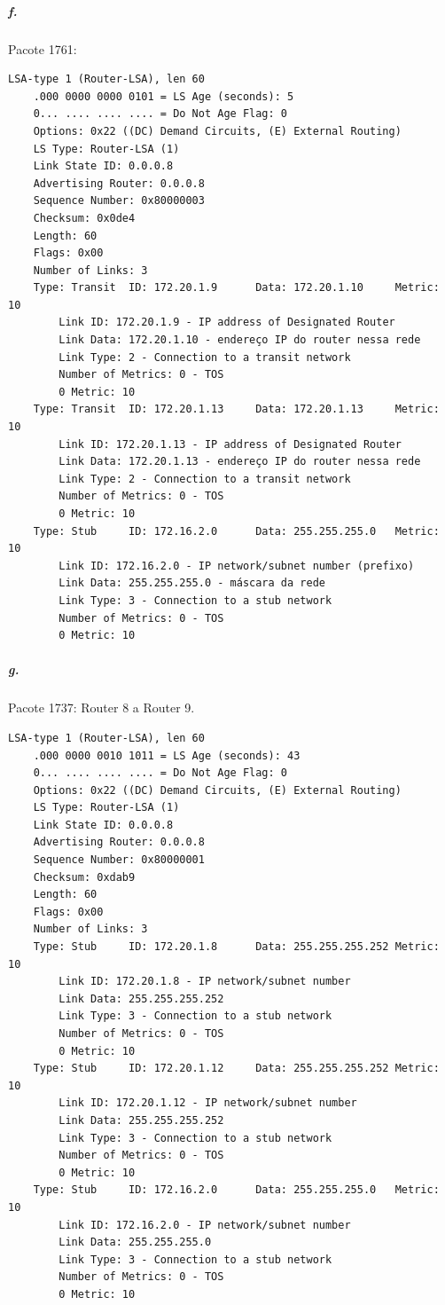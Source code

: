 \subparagraph{f.}
Pacote 1761:
\begin{verbatim}
LSA-type 1 (Router-LSA), len 60
    .000 0000 0000 0101 = LS Age (seconds): 5
    0... .... .... .... = Do Not Age Flag: 0
    Options: 0x22 ((DC) Demand Circuits, (E) External Routing)
    LS Type: Router-LSA (1)
    Link State ID: 0.0.0.8
    Advertising Router: 0.0.0.8
    Sequence Number: 0x80000003
    Checksum: 0x0de4
    Length: 60
    Flags: 0x00
    Number of Links: 3
    Type: Transit  ID: 172.20.1.9      Data: 172.20.1.10     Metric: 10
        Link ID: 172.20.1.9 - IP address of Designated Router
        Link Data: 172.20.1.10 - endereço IP do router nessa rede
        Link Type: 2 - Connection to a transit network
        Number of Metrics: 0 - TOS
        0 Metric: 10
    Type: Transit  ID: 172.20.1.13     Data: 172.20.1.13     Metric: 10
        Link ID: 172.20.1.13 - IP address of Designated Router
        Link Data: 172.20.1.13 - endereço IP do router nessa rede
        Link Type: 2 - Connection to a transit network
        Number of Metrics: 0 - TOS
        0 Metric: 10
    Type: Stub     ID: 172.16.2.0      Data: 255.255.255.0   Metric: 10
        Link ID: 172.16.2.0 - IP network/subnet number (prefixo)
        Link Data: 255.255.255.0 - máscara da rede
        Link Type: 3 - Connection to a stub network
        Number of Metrics: 0 - TOS
        0 Metric: 10
\end{verbatim}

\subparagraph{g.}
Pacote 1737: Router 8 a Router 9.
\begin{verbatim}
LSA-type 1 (Router-LSA), len 60
    .000 0000 0010 1011 = LS Age (seconds): 43
    0... .... .... .... = Do Not Age Flag: 0
    Options: 0x22 ((DC) Demand Circuits, (E) External Routing)
    LS Type: Router-LSA (1)
    Link State ID: 0.0.0.8
    Advertising Router: 0.0.0.8
    Sequence Number: 0x80000001
    Checksum: 0xdab9
    Length: 60
    Flags: 0x00
    Number of Links: 3
    Type: Stub     ID: 172.20.1.8      Data: 255.255.255.252 Metric: 10
        Link ID: 172.20.1.8 - IP network/subnet number
        Link Data: 255.255.255.252
        Link Type: 3 - Connection to a stub network
        Number of Metrics: 0 - TOS
        0 Metric: 10
    Type: Stub     ID: 172.20.1.12     Data: 255.255.255.252 Metric: 10
        Link ID: 172.20.1.12 - IP network/subnet number
        Link Data: 255.255.255.252
        Link Type: 3 - Connection to a stub network
        Number of Metrics: 0 - TOS
        0 Metric: 10
    Type: Stub     ID: 172.16.2.0      Data: 255.255.255.0   Metric: 10
        Link ID: 172.16.2.0 - IP network/subnet number
        Link Data: 255.255.255.0
        Link Type: 3 - Connection to a stub network
        Number of Metrics: 0 - TOS
        0 Metric: 10
\end{verbatim}

